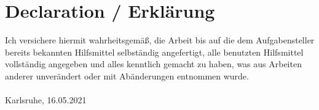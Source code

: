 
\chapter*{Declaration / Erkl\"arung}
Ich versichere hiermit wahrheitsgemäß, die Arbeit bis auf die dem Aufgabensteller bereits bekannten Hilfsmittel selbständig angefertigt,
alle benutzten Hilfsmittel vollständig angegeben und alles kenntlich gemacht zu haben, was aus Arbeiten anderer unverändert oder mit Abänderungen entnommen wurde.\\

\vspace{2cm}
\myname \\
Karlsruhe, 16.05.2021\\
